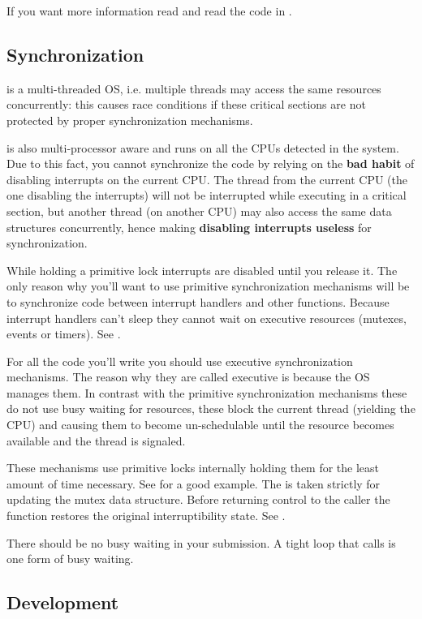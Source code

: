 If you want more information read  and read the code in .

\subsection{Synchronization}

\projectname is a multi-threaded OS, i.e. multiple threads may access the same resources
concurrently: this causes race conditions if these critical sections are not protected by
proper synchronization mechanisms.

\projectname is also multi-processor aware and runs on all the CPUs detected in the system. Due to
this fact, you cannot synchronize the code by relying on the \textbf{bad habit} of disabling
interrupts on the current CPU. The thread from the current CPU (the one disabling the interrupts)
will not be interrupted while executing in a critical section, but another thread (on another CPU)
may also access the same data structures concurrently, hence making \textbf{disabling interrupts
useless} for synchronization.

While holding a primitive lock interrupts are disabled until you release it. The only reason why
you'll want to use primitive synchronization mechanisms will be to synchronize code between
interrupt handlers and other functions. Because interrupt handlers can't sleep they cannot wait on
executive resources (mutexes, events or timers). See .

For all the code you'll write you should use executive synchronization mechanisms. The reason why
they are called executive is because the OS manages them. In contrast with the primitive
synchronization mechanisms these do not use busy waiting for resources, these block the current
thread (yielding the CPU) and causing them to become un-schedulable until the resource becomes
available and the thread is signaled.

These mechanisms use primitive locks internally holding them for the least amount of time necessary.
See  for a good example. The  is taken strictly for updating the
mutex data structure. Before returning control to the caller the function restores the original
interruptibility state. See .

There should be no busy waiting in your submission. A tight loop that calls  is
one form of busy waiting.

\subsection{Development}

